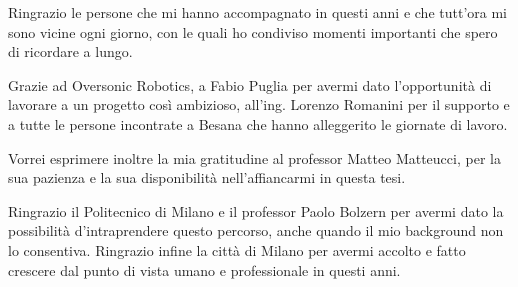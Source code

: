 \documentclass{Configuration_Files/PoliMi3i_thesis}
\begin{document}
Ringrazio le persone che mi hanno accompagnato in questi anni e che tutt’ora
mi sono vicine ogni giorno, con le quali ho condiviso momenti importanti che spero di ricordare a lungo.

Grazie ad Oversonic Robotics, a Fabio Puglia per avermi dato l’opportunità di lavorare
a un progetto così ambizioso, all’ing. Lorenzo Romanini per il supporto e a tutte le
persone incontrate a Besana che hanno alleggerito le giornate di lavoro.


Vorrei esprimere inoltre la mia gratitudine al professor Matteo Matteucci, per la sua
pazienza e la sua disponibilità nell’affiancarmi in questa tesi.

Ringrazio il Politecnico di Milano e il professor Paolo Bolzern per avermi dato la possibilità d'intraprendere questo percorso, anche quando il
mio background non lo consentiva.
Ringrazio infine la città di Milano per avermi accolto e fatto crescere dal punto di vista
umano e professionale in questi anni.



\cleardoublepage
\end{document}
